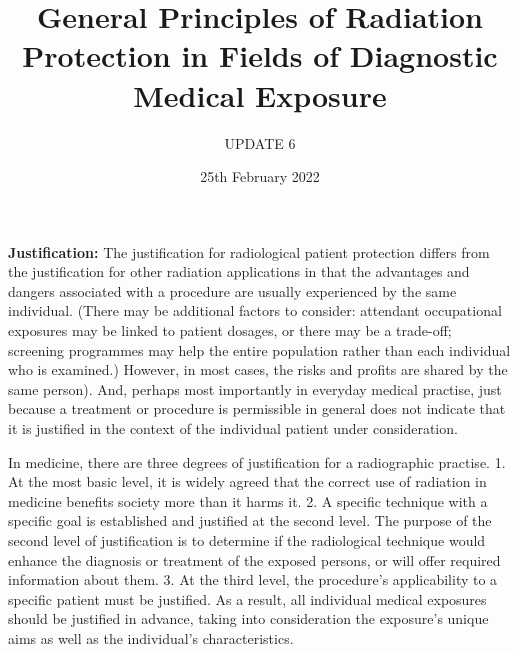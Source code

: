 \documentclass[12pt]{article}
\title{General Principles of Radiation Protection in Fields of Diagnostic Medical Exposure}
\author{UPDATE 6}
\date{25th February 2022}
\begin{document}
\maketitle

\textbf{Justification:}
The justification for radiological patient protection differs from the justification for other radiation applications in that the advantages and dangers associated with a procedure are usually experienced by the same individual. (There may be additional factors to consider: attendant occupational exposures may be linked to patient dosages, or there may be a trade-off; screening programmes may help the entire population rather than each individual who is examined.) However, in most cases, the risks and profits are shared by the same person). And, perhaps most importantly in everyday medical practise, just because a treatment or procedure is permissible in general does not indicate that it is justified in the context of the individual patient under consideration. 

In medicine, there are three degrees of justification for a radiographic practise.
1. At the most basic level, it is widely agreed that the correct use of radiation in medicine benefits society more than it harms it.
2. A specific technique with a specific goal is established and justified at the second level. The purpose of the second level of justification is to determine if the radiological technique would enhance the diagnosis or treatment of the exposed persons, or will offer required information about them.
3. At the third level, the procedure's applicability to a specific patient must be justified. As a result, all individual medical exposures should be justified in advance, taking into consideration the exposure's unique aims as well as the individual's characteristics.
\end{document}
